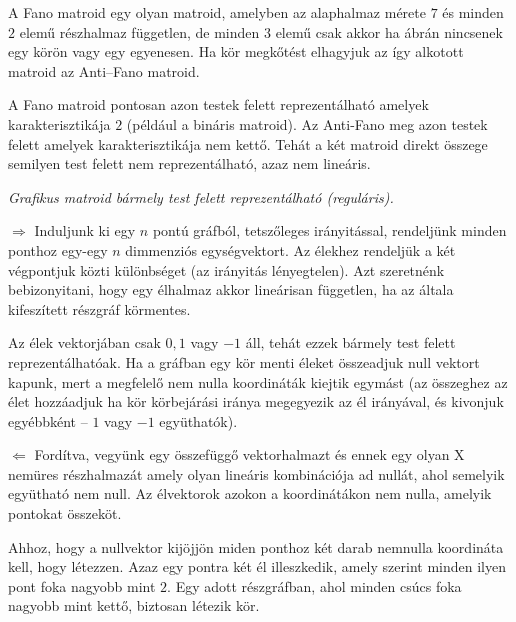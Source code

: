 A Fano matroid egy olyan matroid, amelyben az alaphalmaz mérete $7$ és minden
$2$ elemű részhalmaz független, de minden $3$ elemű csak akkor ha
 ábrán nincsenek egy körön vagy egy egyenesen. Ha kör megkőtést
elhagyjuk az így alkotott matroid az Anti--Fano matroid.

A Fano matroid pontosan azon testek felett reprezentálható amelyek
karakterisztikája $2$ (például a bináris matroid). Az Anti-Fano meg azon testek
felett amelyek karakterisztikája nem kettő. Tehát a két matroid direkt összege
semilyen test felett nem reprezentálható, azaz nem lineáris.

\vspace{0.4cm}
\emph{Grafikus matroid bármely test felett reprezentálható (reguláris).}
\vspace{0.4cm}

$\Rightarrow$ Induljunk ki egy $n$ pontú gráfból, tetszőleges irányitással,
rendeljünk minden ponthoz egy-egy $n$ dimmenziós egységvektort. Az élekhez
rendeljük a két végpontjuk közti különbséget (az irányitás lényegtelen). Azt
szeretnénk bebizonyitani, hogy egy élhalmaz akkor lineárisan független, ha az
általa kifeszített részgráf körmentes.

Az élek vektorjában csak $0,1$ vagy $-1$ áll, tehát ezzek bármely test felett
reprezentálhatóak. Ha a gráfban egy kör menti éleket összeadjuk null vektort
kapunk, mert a megfelelő nem nulla koordináták kiejtik egymást (az összeghez az
élet hozzáadjuk ha kör körbejárási iránya megegyezik az él irányával, és
kivonjuk egyébbként -- $1$ vagy $-1$ együthatók).

$\Leftarrow$ Fordítva, vegyünk egy összefüggő vektorhalmazt és ennek egy olyan X
nemüres részhalmazát amely olyan lineáris kombinációja ad nullát, ahol semelyik
együtható nem null. Az élvektorok azokon a koordinátákon nem nulla, amelyik
pontokat összeköt. 

Ahhoz, hogy a nullvektor kijöjjön miden ponthoz két darab nemnulla koordináta
kell, hogy létezzen. Azaz egy pontra két él illeszkedik, amely szerint minden
ilyen pont foka nagyobb mint $2$.  Egy adott részgráfban, ahol minden csúcs foka
nagyobb mint kettő, biztosan létezik kör.

